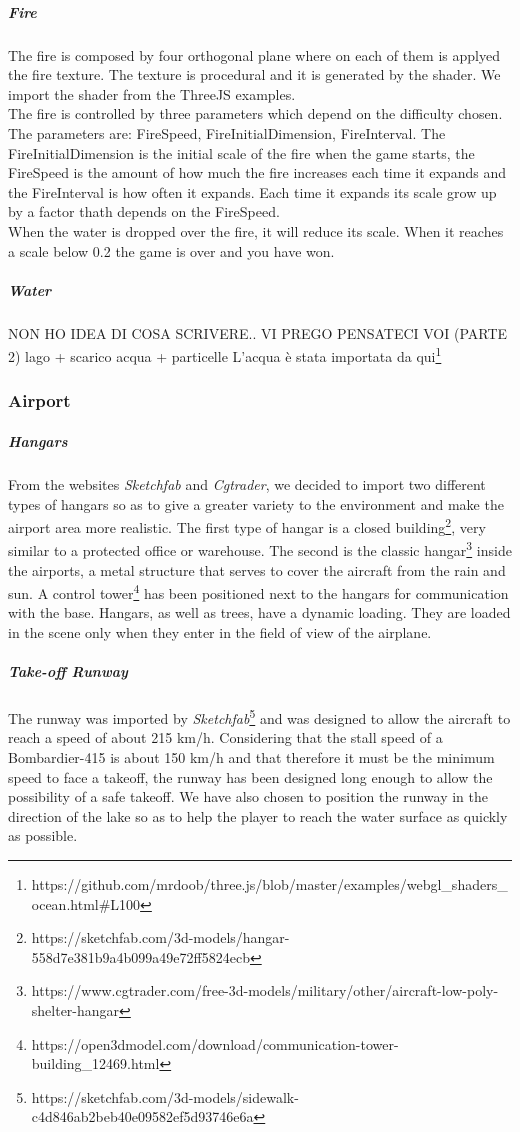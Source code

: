 \documentclass{article}
\begin{document}
\subparagraph*{Fire}
The fire is composed by four orthogonal plane where on each of them is applyed the fire texture. The texture is procedural and it is generated by the shader. We import the shader from the ThreeJS examples. \\
The fire is controlled by three parameters which depend on the difficulty chosen. The parameters are: FireSpeed, FireInitialDimension, FireInterval. The FireInitialDimension is the initial scale of the fire when the game starts, the FireSpeed is the amount of how much the fire increases each time it expands and the FireInterval is how often it expands. Each time it expands its scale grow up by a factor thath depends on the FireSpeed. \\
When the water is dropped over the fire, it will reduce its scale. When it reaches a scale below 0.2 the game is over and you have won.

\subparagraph*{Water}
NON HO IDEA DI COSA SCRIVERE.. VI PREGO PENSATECI VOI (PARTE 2)
lago + scarico acqua + particelle
L'acqua è stata importata da qui\footnote{https://github.com/mrdoob/three.js/blob/master/examples/webgl\_shaders\_ocean.html\#L100}

\subsubsection*{Airport}

\subparagraph*{Hangars}
From the websites \textit{Sketchfab} and \textit{Cgtrader}, we decided to import two different types of hangars so as to give a greater variety to the environment and make the airport area more realistic. The first type of hangar is a closed building\footnote{https://sketchfab.com/3d-models/hangar-558d7e381b9a4b099a49e72ff5824ecb}, very similar to a protected office or warehouse.
The second is the classic hangar\footnote{https://www.cgtrader.com/free-3d-models/military/other/aircraft-low-poly-shelter-hangar} inside the airports, a metal structure that serves to cover the aircraft from the rain and sun. A control tower\footnote{https://open3dmodel.com/download/communication-tower-building\_12469.html} has been positioned next to the hangars for communication with the base.
Hangars, as well as trees, have a dynamic loading. They are loaded in the scene only when they enter in the field of view of the airplane.

\subparagraph*{Take-off Runway}
The runway was imported by \textit{Sketchfab}\footnote{https://sketchfab.com/3d-models/sidewalk-c4d846ab2beb40e09582ef5d93746e6a} and was designed to allow the aircraft to reach a speed of about 215 km/h. Considering that the stall speed of a Bombardier-415 is about 150 km/h and that therefore it must be the minimum speed to face a takeoff, the runway has been designed long enough to allow the possibility of a safe takeoff. We have also chosen to position the runway in the direction of the lake so as to help the player to reach the water surface as quickly as possible. 
\end{document}
